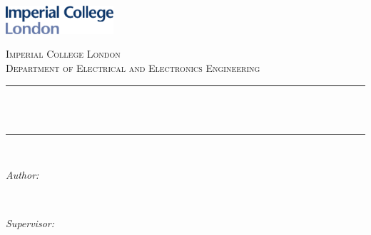 \begin{titlepage}

    \newcommand{\HRule}{\rule{\linewidth}{0.5mm}} %
    
    
    
    \includegraphics[width = 4cm]{./images/title/imperial}\\[0.5cm] 
    
    \center %
    
    
    \textsc{\Large Imperial College London}\\[0.5cm] 
    \textsc{\large Department of Electrical and Electronics Engineering}\\[0.5cm] 
    
    
    \HRule \\[0cm]
    { \huge \bfseries \reporttitle \\} %
    \HRule \\[0.5cm]
     
    
    \begin{minipage}{0.4\textwidth}
    \begin{flushleft} \large
    \emph{Author:}\\
    \reportauthor %
    \end{flushleft}
    \end{minipage}
    ~
    \begin{minipage}{0.4\textwidth}
    \begin{flushright} \large
    \emph{Supervisor:} \\
    \supervisor %
    \end{flushright}
    \end{minipage}\\[4cm]
    

\end{titlepage}
